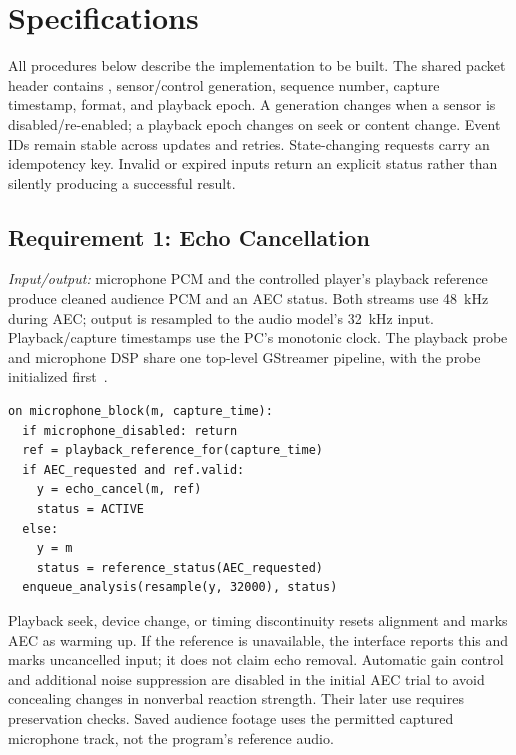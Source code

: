 \section{Specifications}
All procedures below describe the implementation to be built. The shared packet header contains , sensor/control generation, sequence number, capture timestamp, format, and playback epoch. A generation changes when a sensor is disabled/re-enabled; a playback epoch changes on seek or content change. Event IDs remain stable across updates and retries. State-changing requests carry an idempotency key. Invalid or expired inputs return an explicit status rather than silently producing a successful result.

\subsection{Requirement 1: Echo Cancellation}
\textit{Input/output:} microphone PCM and the controlled player's playback reference produce cleaned audience PCM and an AEC status. Both streams use 48~kHz during AEC; output is resampled to the audio model's 32~kHz input. Playback/capture timestamps use the PC's monotonic clock. The playback probe and microphone DSP share one top-level GStreamer pipeline, with the probe initialized first~\cite{gst-aec}.
\par\smallskip\noindent\begin{minipage}{\columnwidth}
\begin{lstlisting}
on microphone_block(m, capture_time):
  if microphone_disabled: return
  ref = playback_reference_for(capture_time)
  if AEC_requested and ref.valid:
    y = echo_cancel(m, ref)
    status = ACTIVE
  else:
    y = m
    status = reference_status(AEC_requested)
  enqueue_analysis(resample(y, 32000), status)
\end{lstlisting}
\end{minipage}\par
Playback seek, device change, or timing discontinuity resets alignment and marks AEC as warming up. If the reference is unavailable, the interface reports this and marks uncancelled input; it does not claim echo removal. Automatic gain control and additional noise suppression are disabled in the initial AEC trial to avoid concealing changes in nonverbal reaction strength. Their later use requires preservation checks. Saved audience footage uses the permitted captured microphone track, not the program's reference audio.

